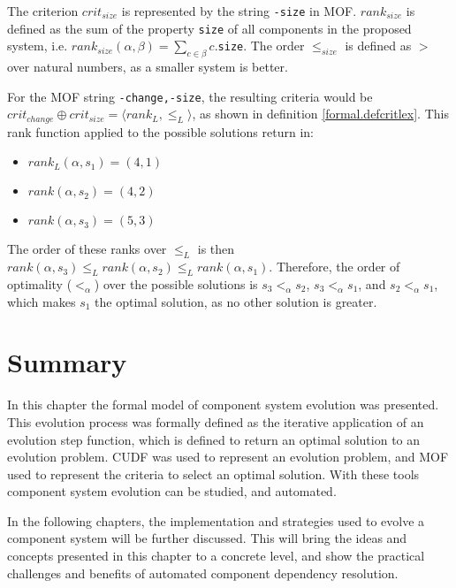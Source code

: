 The criterion $crit_{size}$ is represented by the string \verb+-size+ in MOF.
$rank_{size}$ is defined as the sum of the property \verb+size+ of all components in the  proposed system, i.e. $rank_{size}(\alpha,\beta) = \sum_{c \in \beta} c$.\verb+size+.
The order $\leq_{size}$ is defined as $>$ over natural numbers, as a smaller system is better. 

For the MOF string \verb+-change,-size+, the resulting criteria would be $crit_{change} \oplus crit_{size} = \langle rank_L, \leq_L \rangle$, as shown in definition \ref{formal.defcritlex}.
This rank function applied to the possible solutions return in:
\begin{itemize}
  \item $rank_L(\alpha,s_1) = (4, 1)$
  \item $rank(\alpha,s_2) = (4, 2)$
  \item $rank(\alpha,s_3) = (5, 3)$
\end{itemize}
The order of these ranks over $\leq_L$ is then $rank(\alpha,s_3) \leq_L rank(\alpha,s_2) \leq_L rank(\alpha,s_1)$.
Therefore, the order of optimality ($<_{\alpha}$) over the possible solutions is $s_3 <_{\alpha} s_2$, $s_3 <_{\alpha} s_1$, and $s_2<_{\alpha} s_1$,
which makes $s_1$ the optimal solution, as no other solution is greater. 

\section{Summary}
In this chapter the formal model of component system evolution was presented.
This evolution process was formally defined as the iterative application of an evolution step function,
which is defined to return an optimal solution to an evolution problem.
CUDF was used to represent an evolution problem, and MOF used to represent the criteria to select an optimal solution.
With these tools component system evolution can be studied, and automated.

In the following chapters, the implementation and strategies used to evolve a component system will be further discussed.
This will bring the ideas and concepts presented in this chapter to a concrete level, and show the practical challenges and benefits of automated component dependency resolution. 